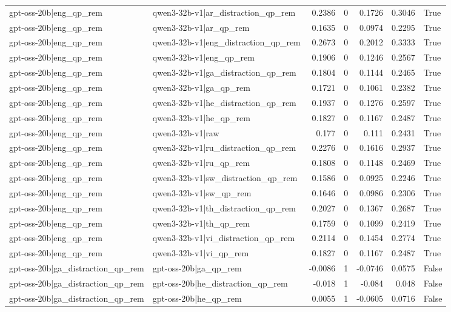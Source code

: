 \begin{table}
\begin{tabular}{l l r r r r l}
gpt-oss-20b|eng_qp_rem & qwen3-32b-v1|ar_distraction_qp_rem & 0.2386 & 0 & 0.1726 & 0.3046 & True \\
gpt-oss-20b|eng_qp_rem & qwen3-32b-v1|ar_qp_rem & 0.1635 & 0 & 0.0974 & 0.2295 & True \\
gpt-oss-20b|eng_qp_rem & qwen3-32b-v1|eng_distraction_qp_rem & 0.2673 & 0 & 0.2012 & 0.3333 & True \\
gpt-oss-20b|eng_qp_rem & qwen3-32b-v1|eng_qp_rem & 0.1906 & 0 & 0.1246 & 0.2567 & True \\
gpt-oss-20b|eng_qp_rem & qwen3-32b-v1|ga_distraction_qp_rem & 0.1804 & 0 & 0.1144 & 0.2465 & True \\
gpt-oss-20b|eng_qp_rem & qwen3-32b-v1|ga_qp_rem & 0.1721 & 0 & 0.1061 & 0.2382 & True \\
gpt-oss-20b|eng_qp_rem & qwen3-32b-v1|he_distraction_qp_rem & 0.1937 & 0 & 0.1276 & 0.2597 & True \\
gpt-oss-20b|eng_qp_rem & qwen3-32b-v1|he_qp_rem & 0.1827 & 0 & 0.1167 & 0.2487 & True \\
gpt-oss-20b|eng_qp_rem & qwen3-32b-v1|raw & 0.177 & 0 & 0.111 & 0.2431 & True \\
gpt-oss-20b|eng_qp_rem & qwen3-32b-v1|ru_distraction_qp_rem & 0.2276 & 0 & 0.1616 & 0.2937 & True \\
gpt-oss-20b|eng_qp_rem & qwen3-32b-v1|ru_qp_rem & 0.1808 & 0 & 0.1148 & 0.2469 & True \\
gpt-oss-20b|eng_qp_rem & qwen3-32b-v1|sw_distraction_qp_rem & 0.1586 & 0 & 0.0925 & 0.2246 & True \\
gpt-oss-20b|eng_qp_rem & qwen3-32b-v1|sw_qp_rem & 0.1646 & 0 & 0.0986 & 0.2306 & True \\
gpt-oss-20b|eng_qp_rem & qwen3-32b-v1|th_distraction_qp_rem & 0.2027 & 0 & 0.1367 & 0.2687 & True \\
gpt-oss-20b|eng_qp_rem & qwen3-32b-v1|th_qp_rem & 0.1759 & 0 & 0.1099 & 0.2419 & True \\
gpt-oss-20b|eng_qp_rem & qwen3-32b-v1|vi_distraction_qp_rem & 0.2114 & 0 & 0.1454 & 0.2774 & True \\
gpt-oss-20b|eng_qp_rem & qwen3-32b-v1|vi_qp_rem & 0.1827 & 0 & 0.1167 & 0.2487 & True \\
gpt-oss-20b|ga_distraction_qp_rem & gpt-oss-20b|ga_qp_rem & -0.0086 & 1 & -0.0746 & 0.0575 & False \\
gpt-oss-20b|ga_distraction_qp_rem & gpt-oss-20b|he_distraction_qp_rem & -0.018 & 1 & -0.084 & 0.048 & False \\
gpt-oss-20b|ga_distraction_qp_rem & gpt-oss-20b|he_qp_rem & 0.0055 & 1 & -0.0605 & 0.0716 & False \\

\end{tabular}
\end{table}
